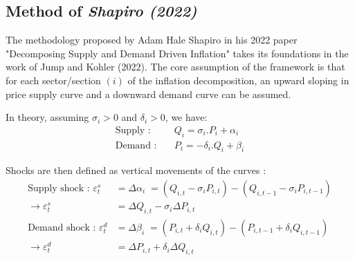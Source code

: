 \subsection{Method of \textit{Shapiro (2022)}}

The methodology proposed by Adam Hale Shapiro in his 2022 paper "Decomposing Supply and Demand Driven Inflation" takes its foundations in the work of Jump and Kohler (2022).
The core assumption of the framework is that for each sector/section $(i)$ of the inflation decomposition, an upward sloping in price supply curve and a downward demand curve can be assumed.

\begin{center}
\end{center}

\noindent In theory, assuming $\sigma_{i}>0$ and $\delta_{i}>0$, we have:
\begin{align*}
    \textrm{Supply :} & \quad Q_{i} = \sigma_{i}.P_{i} + \alpha_{i}\\
    \textrm{Demand :} & \quad P_{i} = -\delta_{i}.Q_{i} + \beta_{i}
\end{align*}

\noindent Shocks are then defined as vertical movements of the curves :
\begin{align*}
    \textrm{Supply shock : } \varepsilon_{t}^{s} &= \Delta \alpha_{i} \; = (Q_{i,t} - \sigma_{i}P_{i,t}) - (Q_{i,t-1} - \sigma_{i}P_{i,t-1})\\
    \rightarrow \varepsilon_{t}^{s} &= \Delta Q_{i,t} - \sigma_{i}\Delta P_{i,t}\\
    \textrm{Demand shock : } \varepsilon_{t}^{d} &= \Delta \beta_{i} \; = (P_{i,t} + \delta_{i}Q_{i,t}) - (P_{i,t-1} + \delta_{i}Q_{i,t-1})\\
    \rightarrow \varepsilon_{t}^{d} &= \Delta P_{i,t} + \delta_{i}\Delta Q_{i,t}
\end{align*}


